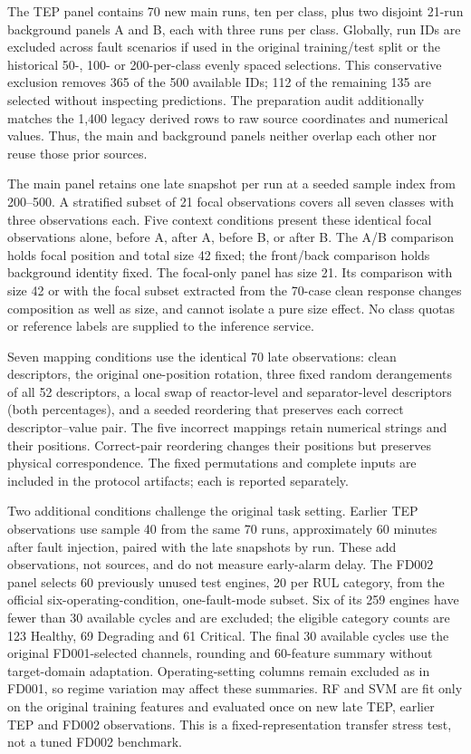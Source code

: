 \documentclass[11pt,a4paper]{article}
\begin{document}
The TEP panel contains 70 new main runs, ten per class, plus two disjoint 21-run background panels A and B, each with three runs per class. Globally, run IDs are excluded across fault scenarios if used in the original training/test split or the historical 50-, 100- or 200-per-class evenly spaced selections. This conservative exclusion removes 365 of the 500 available IDs; 112 of the remaining 135 are selected without inspecting predictions. The preparation audit additionally matches the 1,400 legacy derived rows to raw source coordinates and numerical values. Thus, the main and background panels neither overlap each other nor reuse those prior sources.

The main panel retains one late snapshot per run at a seeded sample index from 200--500. A stratified subset of 21 focal observations covers all seven classes with three observations each. Five context conditions present these identical focal observations alone, before A, after A, before B, or after B. The A/B comparison holds focal position and total size 42 fixed; the front/back comparison holds background identity fixed. The focal-only panel has size 21. Its comparison with size 42 or with the focal subset extracted from the 70-case clean response changes composition as well as size, and cannot isolate a pure size effect. No class quotas or reference labels are supplied to the inference service.

Seven mapping conditions use the identical 70 late observations: clean descriptors, the original one-position rotation, three fixed random derangements of all 52 descriptors, a local swap of reactor-level and separator-level descriptors (both percentages), and a seeded reordering that preserves each correct descriptor--value pair. The five incorrect mappings retain numerical strings and their positions. Correct-pair reordering changes their positions but preserves physical correspondence. The fixed permutations and complete inputs are included in the protocol artifacts; each is reported separately.

Two additional conditions challenge the original task setting. Earlier TEP observations use sample 40 from the same 70 runs, approximately 60 minutes after fault injection, paired with the late snapshots by run. These add observations, not sources, and do not measure early-alarm delay. The FD002 panel selects 60 previously unused test engines, 20 per RUL category, from the official six-operating-condition, one-fault-mode subset. Six of its 259 engines have fewer than 30 available cycles and are excluded; the eligible category counts are 123 Healthy, 69 Degrading and 61 Critical. The final 30 available cycles use the original FD001-selected channels, rounding and 60-feature summary without target-domain adaptation. Operating-setting columns remain excluded as in FD001, so regime variation may affect these summaries. RF and SVM are fit only on the original training features and evaluated once on new late TEP, earlier TEP and FD002 observations. This is a fixed-representation transfer stress test, not a tuned FD002 benchmark.
\end{document}
